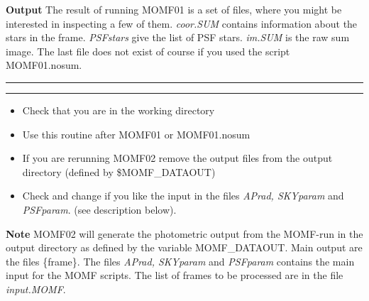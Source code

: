 \documentclass[]{article}
\begin{document}
\vspace{2mm}
{\bf Output}
\vspace{4mm}
\newline The result of running MOMF01 is a set of files, where you might
be interested in inspecting a few of them.
{\sl coor.SUM} contains information about the stars in the frame.
{\sl PSFstars} give the list of PSF stars. {\sl im.SUM} is the raw sum image.
The last file does not exist of course if you used the script
MOMF01.nosum.
\newpage
{}
\newline \rule{15.5cm}{0.3mm}
\vspace{0.1mm}
\newline \rule{15.5cm}{0.3mm}
\vspace{4mm}
\begin{itemize}
\item Check that you are in the working directory
\item Use this routine after MOMF01 or MOMF01.nosum
\item If you are rerunning MOMF02 remove the output files from
the output directory (defined by \$MOMF\_DATAOUT)
\item Check and change if you like
the input in the files {\em APrad, SKYparam} and {\em
PSFparam}. (see description below).
\end{itemize}
\vspace{2mm}
{\bf Note}
\newline MOMF02 will generate the photometric output from the
MOMF-run in the output directory as defined  by the variable
MOMF\_DATAOUT. Main output are the files \{frame\}.
The files {\em APrad, SKYparam} and {\em
PSFparam} contains the main input for the MOMF scripts.
The list of frames to be processed are in the file {\em input.MOMF}.
\vspace{4mm}
\end{document}
